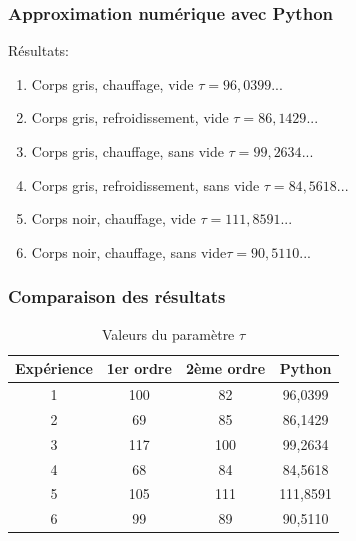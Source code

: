 \documentclass{beamer}
\begin{document}
\begin{frame}
\frametitle{Approximation numérique avec Python}
Résultats:
\begin{enumerate}
	\item{{\color{gray7}Corps gris}{\color{gray4}, {\color{red}chauffage}, vide} \hfill $\tau = 96,0399...$\hspace{4em} \newline}
	\item{{\color{gray7}Corps gris}{\color{gray4}, {\color{blue5}refroidissement}, vide} \hfill $\tau = 86,1429...$\hspace{4em} \newline}
	\item{{\color{gray7}Corps gris}{\color{gray4}, {\color{red}chauffage}, sans vide} \hfill $\tau = 99,2634...$\hspace{4em} \newline}
	\item{{\color{gray7}Corps gris}{\color{gray4}, {\color{blue5}refroidissement}, sans vide} \hfill $\tau = 84,5618...$\hspace{4em} \newline}
	\item{{\color{black}Corps noir}{\color{gray4}, {\color{red}chauffage}, vide} \hfill $\tau = 111,8591...$\hspace{4em} \newline}
	\item{{\color{black}Corps noir}{\color{gray4}, {\color{red}chauffage}, sans vide}\hfill $\tau = 90,5110...$\hspace{4em} \newline}
\end{enumerate}
\end{frame}





\begin{frame}
\frametitle{Comparaison des résultats}

\begin{table}[htdp]\begin{center}\begin{tabular}{|c|c|c|c|}
\hline
Expérience & 1er ordre & 2ème ordre & Python \\
\hline
1 & 100 & 82 & 96,0399 \\
2 & 69 & 85 & 86,1429 \\
3 & 117 & 100 & 99,2634 \\
4 & 68 & 84 & 84,5618 \\
5 & 105 & 111 & 111,8591 \\
6 & 99 & 89 & 90,5110 \\
\hline
\end{tabular} 
\caption{Valeurs du paramètre $\tau$}\end{center}\label{defaulttable}\end{table}

\end{frame}
\end{document}
